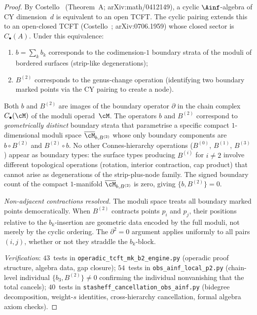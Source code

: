 \begin{proof}
By Costello~\cite{Costello2005TCFT} (Theorem~A;
arXiv:math/0412149), a cyclic $\Ainf$-algebra of CY dimension~$d$
is equivalent to an open TCFT.  The cyclic pairing extends this
to an open-closed TCFT (Costello~\cite{Costello2007Ainfty};
arXiv:0706.1959) whose closed sector is $C_\bullet(A)$.  Under
this equivalence:
\begin{enumerate}[label=\textup{(\roman*)}]
 \item $b = \sum_k b_k$ corresponds to the codimension-$1$
  boundary strata of the moduli of bordered surfaces
  (strip-like degenerations);
 \item $B^{(2)}$ corresponds to the genus-change operation
  (identifying two boundary marked points via the CY pairing
  to create a node).
\end{enumerate}
Both $b$ and $B^{(2)}$ are images of the boundary operator
$\partial$ in the chain complex $C_\bullet(\cM)$ of the moduli
operad~$\cM$.  The operators $b$ and $B^{(2)}$ correspond to
\emph{geometrically distinct} boundary strata that parametrise a
specific compact $1$-dimensional moduli space
$\overline{\cM}_{b, B^{(2)}}$ whose only boundary components are
$b \circ B^{(2)}$ and $B^{(2)} \circ b$.  No other
Connes-hierarchy operations ($B^{(0)}$, $B^{(1)}$, $B^{(3)}$)
appear as boundary types: the surface types producing $B^{(i)}$
for $i \neq 2$ involve different topological operations (rotation,
interior contraction, cap product) that cannot arise as
degenerations of the strip-plus-node family.  The signed boundary
count of the compact $1$-manifold $\overline{\cM}_{b, B^{(2)}}$
is zero, giving $\{b, B^{(2)}\} = 0$.

\smallskip\noindent\emph{Non-adjacent contractions resolved.}
The moduli space treats all boundary marked points democratically.
When $B^{(2)}$ contracts points $p_i$ and $p_j$, their positions
relative to the $b_k$-insertion are geometric data encoded by
the full moduli, not merely by the cyclic ordering.  The
$\partial^2 = 0$ argument applies uniformly to all pairs
$(i,j)$, whether or not they straddle the $b_k$-block.

\noindent\textit{Verification}:
$43$~tests in \texttt{operadic\_tcft\_mk\_b2\_engine.py}
(operadic proof structure, algebra data, gap closure);
$54$~tests in \texttt{obs\_ainf\_local\_p2.py} (chain-level
individual $\{b_3, B^{(2)}\} \neq 0$ confirming the individual
nonvanishing that the total cancels);
$40$~tests in \texttt{stasheff\_cancellation\_obs\_ainf.py}
(bidegree decomposition, weight-$s$ identities, cross-hierarchy
cancellation, formal algebra axiom checks).
\end{proof}

